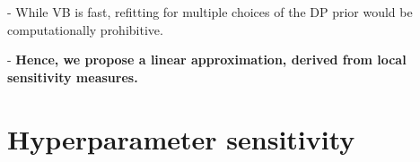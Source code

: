 \documentclass[a0,plainsections,30pt]{sciposter}\usepackage[]{graphicx}\usepackage[]{color}
\newcommand{\Expect}{\mathbb{E}}
\newcommand{\etazopt}{\eta_z^{*}}
\newcommand{\etathetaopt}{\eta_\theta^{*}}
\DeclareMathOperator*{\argmin}{arg\,min}
\begin{document}
\begin{minipage}[t]{0.45\textwidth}
\begin{mdframed}[style=MyFrame]
- While VB is fast, refitting for multiple choices of the DP prior would be
computationally prohibitive.

- {\bf Hence, we propose a linear approximation, derived from local sensitivity measures. }
\end{mdframed}



%
%
%

\vspace{-0.6in}
\section*{Hyperparameter sensitivity}
\vspace{-0.3in}


\end{minipage}
\end{document}
